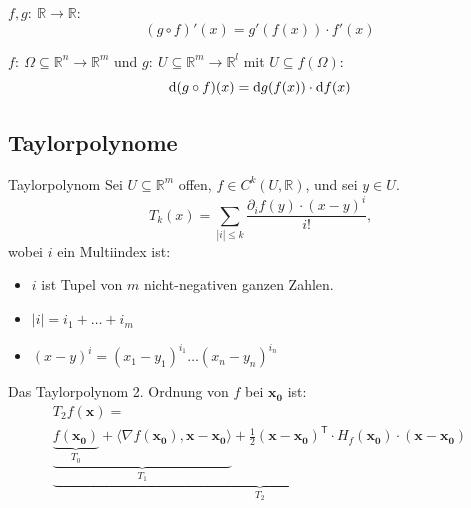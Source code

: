 \documentclass[a4paper,10pt]{article}
\def\R{\mathbb{R}}
\begin{document}
\( f, g: \: \R \to \R \):
\[
    (g \circ f)' (x) = g'(f(x)) \cdot f'(x)
\]

\( f: \: \Omega \subseteq \R^n \to \R^m \) und \( g: \: U \subseteq \R^m \to \R^l \) mit \( U \subseteq f(\Omega) \):
\[
    \odif{(g \circ f)}(x) = \odif{g}(f(x)) \cdot \odif{f}(x)
\]


\subsection{Taylorpolynome}

\begin{mainbox}{Taylorpolynom}
    Sei \( U \subseteq \R^m \) offen, \( f \in C^k(U, \R) \), und sei \( y \in U\).
    \[
        T_k(x) = \sum_{|i| \leq k} \frac{\partial_i f(y) \cdot (x - y)^i}{i!} \text{,}
    \]
    wobei \( i \) ein Multiindex ist:
    \begin{itemize}
        \item \( i \) ist Tupel von \( m \) nicht-negativen ganzen Zahlen.
        \item  \( |i| = i_1 + \dots + i_m \)
        \item \( (x - y)^i = (x_1 - y_1)^{i_1} \dots (x_n - y_n)^{i_n} \)
    \end{itemize}
\end{mainbox}

Das Taylorpolynom 2. Ordnung von \( f \) bei \( \mathbf{x_0} \) ist:
\begin{multline*}
    T_2 f(\mathbf{x}) = \\
    \underbrace{\underbrace{\underbrace{f(\mathbf{x_0})}_{T_0} + \langle \nabla f(\mathbf{x_0}), \mathbf{x} - \mathbf{x_0} \rangle}_{T_1} + \frac{1}{2} (\mathbf{x} - \mathbf{x_0})^\mathsf{T} \cdot H_f(\mathbf{x_0}) \cdot (\mathbf{x} - \mathbf{x_0})}_{T_2}
\end{multline*}
\end{document}

